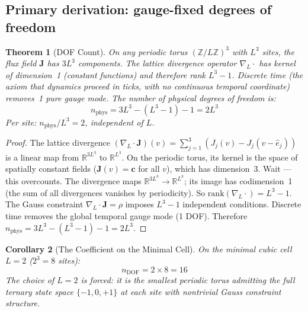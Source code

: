 \documentclass[12pt]{article}
\newtheorem{theorem}{Theorem}[section]
\newtheorem{corollary}[theorem]{Corollary}
\theoremstyle{definition}
\theoremstyle{remark}
\begin{document}
\subsection{Primary derivation: gauge-fixed degrees of freedom}

\begin{theorem}[DOF Count]
\label{thm:dof}
On any periodic torus $(\mathbb{Z}/L\mathbb{Z})^3$ with $L^3$ sites, the flux field $\mathbf{J}$ has $3L^3$ components. The lattice divergence operator $\nabla_L \cdot$ has kernel of dimension~1 (constant functions) and therefore rank $L^3 - 1$. Discrete time (the axiom that dynamics proceed in ticks, with no continuous temporal coordinate) removes~1 pure gauge mode. The number of physical degrees of freedom is:
\begin{equation}
    n_{\mathrm{phys}} = 3L^3 - (L^3 - 1) - 1 = 2L^3
    \label{eq:dof-general}
\end{equation}
Per site: $n_{\mathrm{phys}} / L^3 = 2$, \emph{independent of $L$}.
\end{theorem}

\begin{proof}
The lattice divergence $(\nabla_L \cdot \mathbf{J})(v) = \sum_{j=1}^{3}(J_j(v) - J_j(v - \hat{e}_j))$ is a linear map from $\mathbb{R}^{3L^3}$ to $\mathbb{R}^{L^3}$. On the periodic torus, its kernel is the space of spatially constant fields ($\mathbf{J}(v) = \mathbf{c}$ for all $v$), which has dimension~3. Wait --- this overcounts. The divergence maps $\mathbb{R}^{3L^3} \to \mathbb{R}^{L^3}$; its image has codimension~1 (the sum of all divergences vanishes by periodicity). So $\mathrm{rank}(\nabla_L \cdot) = L^3 - 1$. The Gauss constraint $\nabla_L \cdot \mathbf{J} = \rho$ imposes $L^3 - 1$ independent conditions. Discrete time removes the global temporal gauge mode (1 DOF). Therefore $n_{\mathrm{phys}} = 3L^3 - (L^3 - 1) - 1 = 2L^3$. \qedhere
\end{proof}

\begin{corollary}[The Coefficient on the Minimal Cell]
\label{cor:16}
On the minimal cubic cell $L = 2$ ($2^3 = 8$ sites):
\begin{equation}
    n_{\mathrm{DOF}} = 2 \times 8 = 16
\end{equation}
The choice of $L = 2$ is forced: it is the smallest periodic torus admitting the full ternary state space $\{-1, 0, +1\}$ at each site with nontrivial Gauss constraint structure.
\end{corollary}
\end{document}
